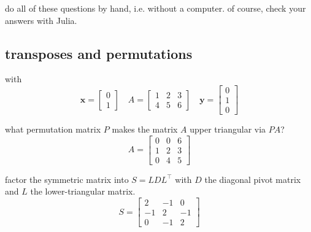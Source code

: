 \documentclass[addpoints]{exam}
\begin{document}
do all of these questions by hand, i.e. without a computer. of course, check your answers with Julia.

\begin{questions}
\subsection*{transposes and permutations}

\question
with
	\begin{equation*}
		\mathbf{x}= \begin{bmatrix} 0 \\ 1\end{bmatrix} \quad A = \begin{bmatrix} 1 & 2 & 3 \\ 4& 5 & 6\end{bmatrix} \quad \mathbf{y}= \begin{bmatrix} 0 \\ 1 \\ 0 \end{bmatrix} 
	\end{equation*}

\question what permutation matrix $P$ makes the matrix $A$ upper triangular via $PA$?
\begin{equation*}
	A = \begin{bmatrix} 0 & 0 & 6 \\ 1 & 2  & 3 \\ 0 &  4 & 5\end{bmatrix}
\end{equation*} 

\question factor the symmetric matrix into $S=LDL^\intercal$ with $D$ the diagonal pivot matrix and $L$ the lower-triangular matrix.
\begin{equation*}
	S = \begin{bmatrix} 2 & -1 & 0 \\ -1 & 2  & -1 \\ 0 &  -1 & 2\end{bmatrix}
\end{equation*} 


\end{questions}
\end{document}
